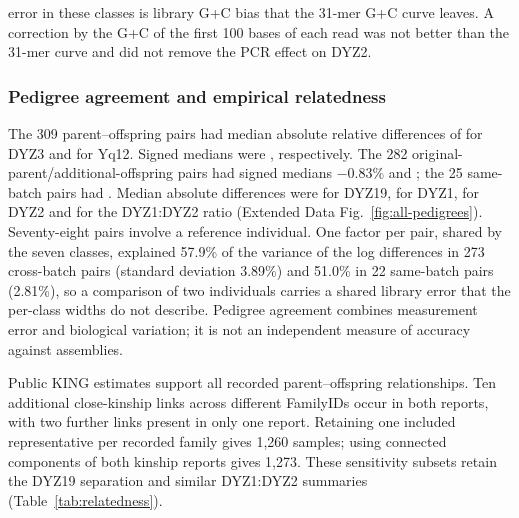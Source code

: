 error in these  classes is library G+C bias that the 31-mer G+C curve leaves.   A correction by the G+C of the first 100 bases of each read was not better than the 31-mer curve and did not remove the PCR effect on DYZ2.

\subsubsection{Pedigree agreement and empirical relatedness}\label{sec:res-pedigree}
The 309 parent--offspring pairs had median absolute relative differences of  for DYZ3 and  for Yq12. Signed medians were , respectively. The 282 original-parent/additional-offspring pairs had signed medians $-0.83\%$ and ; the 25 same-batch pairs had . Median absolute differences were  for DYZ19,  for DYZ1,  for DYZ2 and  for the DYZ1:DYZ2 ratio (Extended Data Fig.~\ref{fig:all-pedigrees}). Seventy-eight pairs involve a reference individual. One factor per pair, shared by the seven classes, explained 57.9\% of the variance of the log differences in 273 cross-batch pairs (standard deviation 3.89\%) and 51.0\% in 22 same-batch pairs (2.81\%), so a comparison of two individuals carries a shared library error that the per-class widths do not describe. Pedigree agreement combines measurement error and biological variation; it is not an independent measure of accuracy against assemblies.

Public KING estimates support all  recorded parent--offspring relationships. Ten additional close-kinship links across different FamilyIDs occur in both reports, with two further links present in only one report. Retaining one included representative per recorded family gives 1,260 samples; using connected components of both kinship reports gives 1,273. These sensitivity subsets retain the DYZ19 separation and similar DYZ1:DYZ2 summaries (Table~\ref{tab:relatedness}).

